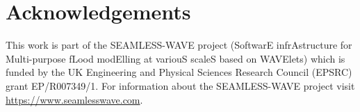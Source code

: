 \section*{Acknowledgements}

This work is part of the SEAMLESS-WAVE project (SoftwarE infrAstructure for Multi-purpose fLood modElling at variouS scaleS based on WAVElets) which is funded by the UK Engineering and Physical Sciences Research Council (EPSRC) grant EP/R007349/1.
For information about the SEAMLESS-WAVE project visit \url{https://www.seamlesswave.com}.